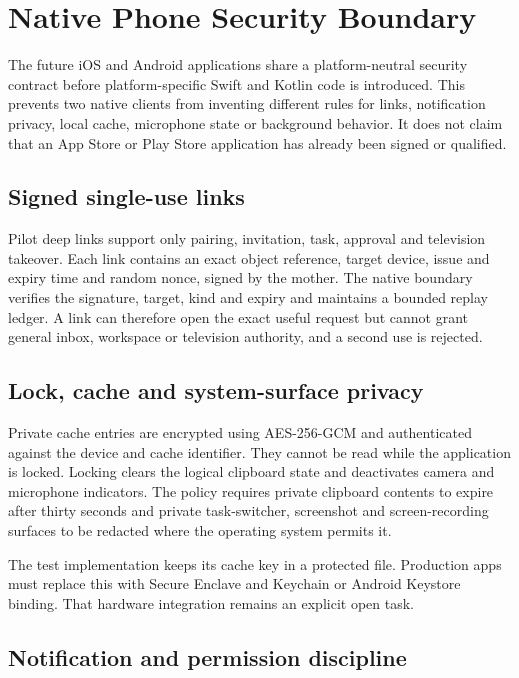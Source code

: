 \section{Native Phone Security Boundary}
\label{sec:pilot-mobile-native-security}

The future iOS and Android applications share a platform-neutral security contract
before platform-specific Swift and Kotlin code is introduced.  This prevents two
native clients from inventing different rules for links, notification privacy,
local cache, microphone state or background behavior.  It does not claim that an
App Store or Play Store application has already been signed or qualified.

\subsection{Signed single-use links}

Pilot deep links support only pairing, invitation, task, approval and television
takeover.  Each link contains an exact object reference, target device, issue and
expiry time and random nonce, signed by the mother.  The native boundary verifies
the signature, target, kind and expiry and maintains a bounded replay ledger.  A
link can therefore open the exact useful request but cannot grant general inbox,
workspace or television authority, and a second use is rejected.

\subsection{Lock, cache and system-surface privacy}

Private cache entries are encrypted using AES-256-GCM and authenticated against the
device and cache identifier.  They cannot be read while the application is locked.
Locking clears the logical clipboard state and deactivates camera and microphone
indicators.  The policy requires private clipboard contents to expire after thirty
seconds and private task-switcher, screenshot and screen-recording surfaces to be
redacted where the operating system permits it.

The test implementation keeps its cache key in a protected file.  Production apps
must replace this with Secure Enclave and Keychain or Android Keystore binding.
That hardware integration remains an explicit open task.

\subsection{Notification and permission discipline}

